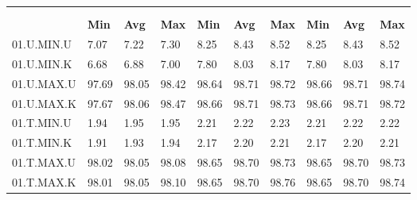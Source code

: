 \begin{tabular}{|>{\raggedright}p{}|>{\raggedright}p{}|>{\raggedright}p{}|>{\raggedright}p{}|>{\raggedright}p{}|>{\raggedright}p{}|>{\raggedright}p{}|>{\raggedright}p{}|>{\raggedright}p{}|>{\raggedright}p{}|}
\hline 
\multirow{3}{0.12\columnwidth}{\textbf{\footnotesize{}Bezeichnung}} & \multicolumn{9}{l|}{\textbf{\footnotesize{}TX-Bitrate {[}MBit/s{]}}}\tabularnewline
\cline{2-10} 
& \multicolumn{3}{l|}{\textbf{\footnotesize{}prp1}} & \multicolumn{3}{l|}{\textbf{\footnotesize{}eth0}} & \multicolumn{3}{l|}{\textbf{\footnotesize{}eth1}}\tabularnewline
\cline{2-10} 
& \textbf{\footnotesize{}Min} & \textbf{\footnotesize{}Avg} & \textbf{\footnotesize{}Max} & \textbf{\footnotesize{}Min} & \textbf{\footnotesize{}Avg} & \textbf{\footnotesize{}Max} & \textbf{\footnotesize{}Min} & \textbf{\footnotesize{}Avg} & \textbf{\footnotesize{}Max}\tabularnewline
\hline 
\hline 
{\footnotesize{}01.U.MIN.U} & {\footnotesize{}7.07} & {\footnotesize{}7.22} & {\footnotesize{}7.30} & {\footnotesize{}8.25} & {\footnotesize{}8.43} & {\footnotesize{}8.52} & {\footnotesize{}8.25} & {\footnotesize{}8.43} & {\footnotesize{}8.52}\tabularnewline
\hline 
\hline 
{\footnotesize{}01.U.MIN.K} & {\footnotesize{}6.68} & {\footnotesize{}6.88} & {\footnotesize{}7.00} & {\footnotesize{}7.80} & {\footnotesize{}8.03} & {\footnotesize{}8.17} & {\footnotesize{}7.80} & {\footnotesize{}8.03} & {\footnotesize{}8.17}\tabularnewline
\hline 
\hline 
{\footnotesize{}01.U.MAX.U} & {\footnotesize{}97.69} & {\footnotesize{}98.05} & {\footnotesize{}98.42} & {\footnotesize{}98.64} & {\footnotesize{}98.71} & {\footnotesize{}98.72} & {\footnotesize{}98.66} & {\footnotesize{}98.71} & {\footnotesize{}98.74}\tabularnewline
\hline 
\hline 
{\footnotesize{}01.U.MAX.K} & {\footnotesize{}97.67} & {\footnotesize{}98.06} & {\footnotesize{}98.47} & {\footnotesize{}98.66} & {\footnotesize{}98.71} & {\footnotesize{}98.73} & {\footnotesize{}98.66} & {\footnotesize{}98.71} & {\footnotesize{}98.72}\tabularnewline
\hline 
\hline 
{\footnotesize{}01.T.MIN.U} & {\footnotesize{}1.94} & {\footnotesize{}1.95} & {\footnotesize{}1.95} & {\footnotesize{}2.21} & {\footnotesize{}2.22} & {\footnotesize{}2.23} & {\footnotesize{}2.21} & {\footnotesize{}2.22} & {\footnotesize{}2.22}\tabularnewline
\hline 
\hline 
{\footnotesize{}01.T.MIN.K} & {\footnotesize{}1.91} & {\footnotesize{}1.93} & {\footnotesize{}1.94} & {\footnotesize{}2.17} & {\footnotesize{}2.20} & {\footnotesize{}2.21} & {\footnotesize{}2.17} & {\footnotesize{}2.20} & {\footnotesize{}2.21}\tabularnewline
\hline 
\hline 
{\footnotesize{}01.T.MAX.U} & {\footnotesize{}98.02} & {\footnotesize{}98.05} & {\footnotesize{}98.08} & {\footnotesize{}98.65} & {\footnotesize{}98.70} & {\footnotesize{}98.73} & {\footnotesize{}98.65} & {\footnotesize{}98.70} & {\footnotesize{}98.73}\tabularnewline
\hline 
\hline 
{\footnotesize{}01.T.MAX.K} & {\footnotesize{}98.01} & {\footnotesize{}98.05} & {\footnotesize{}98.10} & {\footnotesize{}98.65} & {\footnotesize{}98.70} & {\footnotesize{}98.76} & {\footnotesize{}98.65} & {\footnotesize{}98.70} & {\footnotesize{}98.74}\tabularnewline
\hline 
\end{tabular}
\par
